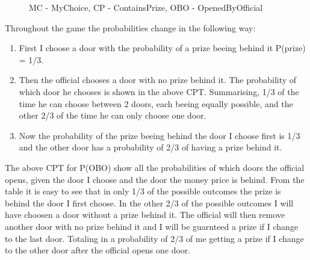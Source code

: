 \documentclass[12pt, letterpaper]{article}
\begin{document}
\begin{figure}[ht]
\begin{tikzpicture}
  \end{tikzpicture}
  \caption{MC - MyChoice, CP - ContainsPrize, OBO - OpenedByOfficial}

\end{figure}

Throughout the game the probabilities change in the following way:
\begin{enumerate}
\item First I choose a door with the probability of a prize beeing behind it
  P(prize) = 1/3.
\item Then the official chooses a door with no prize behind it. The probability
  of which door he chooses is shown in the above CPT. Summarising, 1/3 of the
  time he can choose between 2 doors, each beeing equally possible, and the
  other 2/3 of the time he can only choose one door.
  \item Now the probability of the prize beeing behind the door I choose first
    is 1/3 and the other door has a probability of 2/3 of having a prize behind it.
\end{enumerate}

The above CPT for P(OBO) show all the probabilities of which doors the official
opens, given the door I choose and the door the money price is behind. From the
table it is easy to see that in only 1/3 of the possible outcomes the prize is
behind the door I first choose. In the other 2/3 of the possible outcomes
I will have choosen a door without a prize behind it. The official will then
remove another door with no prize behind it and I will be guarnteed a prize if I
change to the last door. Totaling in a probability of 2/3 of me getting a prize
if I change to the other door after the official opens one door.
\end{document}
